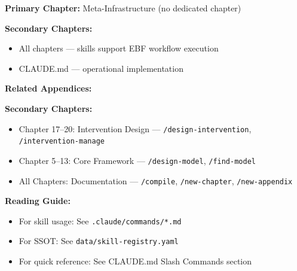 \begin{tcolorbox}[colback=purple!5!white, colframe=purple!75!black,
    title=Chapter Linkage]

\textbf{Primary Chapter:} Meta-Infrastructure (no dedicated chapter)

\textbf{Secondary Chapters:}
\begin{itemize}[nosep]
\item All chapters --- skills support EBF workflow execution
\item CLAUDE.md --- operational implementation
\end{itemize}

\textbf{Related Appendices:}

\textbf{Secondary Chapters:}
\begin{itemize}[nosep]
\item Chapter 17--20: Intervention Design --- \texttt{/design-intervention}, \texttt{/intervention-manage}
\item Chapter 5--13: Core Framework --- \texttt{/design-model}, \texttt{/find-model}
\item All Chapters: Documentation --- \texttt{/compile}, \texttt{/new-chapter}, \texttt{/new-appendix}
\end{itemize}

\textbf{Reading Guide:}
\begin{itemize}[nosep]
\item For skill usage: See \texttt{.claude/commands/*.md}
\item For SSOT: See \texttt{data/skill-registry.yaml}
\item For quick reference: See CLAUDE.md Slash Commands section
\end{itemize}

\end{tcolorbox}


